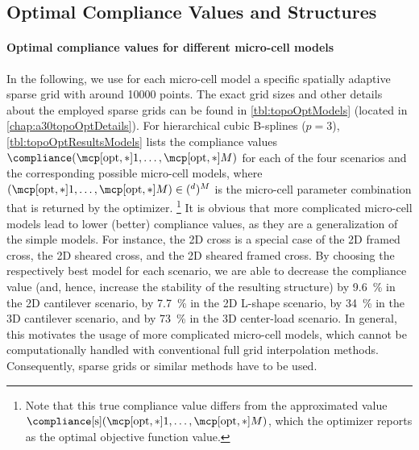 \subsection{Optimal Compliance Values and Structures}
\label{sec:644optimization}

\paragraph{Optimal compliance values for different micro-cell models}

In the following, we use for each micro-cell model
a specific spatially adaptive sparse grid with around \num{10000} points.
The exact grid sizes and other details about the employed sparse grids
can be found in \cref{tbl:topoOptModels}
(located in \cref{chap:a30topoOptDetails}).
For hierarchical cubic B-splines ($p = 3$),
\cref{tbl:topoOptResultsModels} lists the
compliance values $\compliance(\mcpoptappr{1}, \dotsc, \mcpoptappr{M})$
for each of the four scenarios
and the corresponding possible micro-cell models,
where $(\mcpoptappr{1}, \dotsc, \mcpoptappr{M}) \in (\real^d)^M$
is the micro-cell parameter combination that is returned by the optimizer.%
\footnote{%
  Note that this true compliance value differs from the
  approximated value
  $\complianceintp(\mcpoptappr{1}, \dotsc, \mcpoptappr{M})$,
  which the optimizer reports as the optimal objective function value.%
}
It is obvious that more complicated micro-cell models
lead to lower (better) compliance values,
as they are a generalization of the simple models.
For instance, the 2D cross is a special case of
the 2D framed cross, the 2D sheared cross, and the 2D sheared framed cross.
By choosing the respectively best model for each scenario,
we are able to decrease the compliance value
(and, hence, increase the stability of the resulting structure)
by \SI{9.6}{\percent} in the 2D cantilever scenario,
by \SI{7.7}{\percent} in the 2D L-shape scenario,
by \SI{34}{\percent} in the 3D cantilever scenario, and
by \SI{73}{\percent} in the 3D center-load scenario.
In general, this motivates the usage of more complicated micro-cell models,
which cannot be computationally handled with
conventional full grid interpolation methods.
Consequently, sparse grids or similar methods have to be used.

